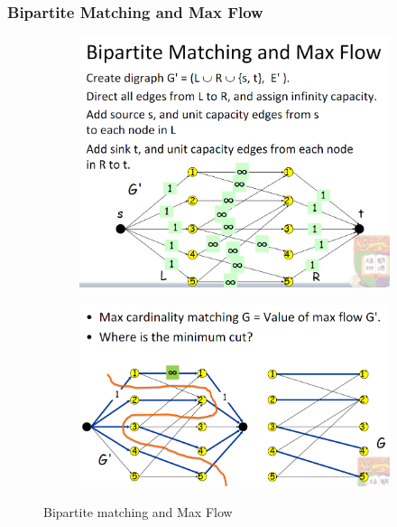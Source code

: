 \subsubsection{Bipartite Matching and Max Flow}
\begin{figure}[H]
    \centering
    \begin{subfigure}{0.309\textwidth}
        \centering
        \includegraphics[width=\textwidth]{pic/DAA10/Bipartite matching and Max Flow}
    \end{subfigure}
    \begin{subfigure}{0.309\textwidth}
        \centering
        \includegraphics[width=\textwidth]{pic/DAA10/Bipartite matching and Max Flow2}
    \end{subfigure}
    \caption{Bipartite matching and Max Flow}
\end{figure}

